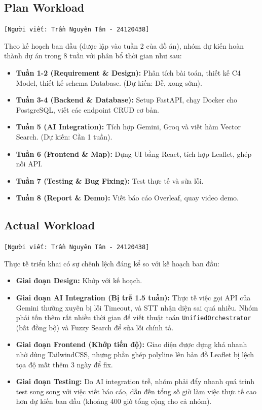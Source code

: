 \subsection{Plan Workload}
\texttt{[Người viết: Trần Nguyên Tân - 24120438]}

Theo kế hoạch ban đầu (được lập vào tuần 2 của đồ án), nhóm dự kiến hoàn thành dự án trong 8 tuần với phân bổ thời gian như sau:
\begin{itemize}
    \item \textbf{Tuần 1-2 (Requirement \& Design):} Phân tích bài toán, thiết kế C4 Model, thiết kế schema Database. (Dự kiến: Dễ, xong sớm).
    \item \textbf{Tuần 3-4 (Backend \& Database):} Setup FastAPI, chạy Docker cho PostgreSQL, viết các endpoint CRUD cơ bản.
    \item \textbf{Tuần 5 (AI Integration):} Tích hợp Gemini, Groq và viết hàm Vector Search. (Dự kiến: Cần 1 tuần).
    \item \textbf{Tuần 6 (Frontend \& Map):} Dựng UI bằng React, tích hợp Leaflet, ghép nối API.
    \item \textbf{Tuần 7 (Testing \& Bug Fixing):} Test thực tế và sửa lỗi.
    \item \textbf{Tuần 8 (Report \& Demo):} Viết báo cáo Overleaf, quay video demo.
\end{itemize}

\subsection{Actual Workload}
\texttt{[Người viết: Trần Nguyên Tân - 24120438]}

Thực tế triển khai có sự chênh lệch đáng kể so với kế hoạch ban đầu:
\begin{itemize}
    \item \textbf{Giai đoạn Design:} Khớp với kế hoạch.
    \item \textbf{Giai đoạn AI Integration (Bị trễ 1.5 tuần):} Thực tế việc gọi API của Gemini thường xuyên bị lỗi Timeout, và STT nhận diện sai quá nhiều. Nhóm phải tốn thêm rất nhiều thời gian để viết thuật toán \texttt{UnifiedOrchestrator} (bất đồng bộ) và Fuzzy Search để sửa lỗi chính tả.
    \item \textbf{Giai đoạn Frontend (Khớp tiến độ):} Giao diện được dựng khá nhanh nhờ dùng TailwindCSS, nhưng phần ghép polyline lên bản đồ Leaflet bị lệch tọa độ mất thêm 3 ngày để fix.
    \item \textbf{Giai đoạn Testing:} Do AI integration trễ, nhóm phải đẩy nhanh quá trình test song song với việc viết báo cáo, dẫn đến tổng số giờ làm việc thực tế cao hơn dự kiến ban đầu (khoảng 400 giờ tổng cộng cho cả nhóm).
\end{itemize}

